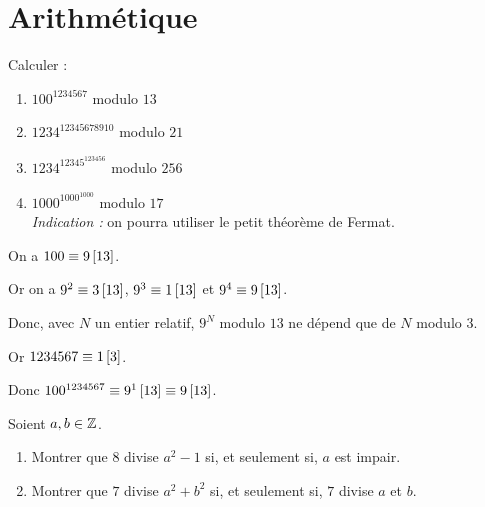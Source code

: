 \begin{corr}
\end{corr}

\section{Arithmétique}

\begin{exo}[Exercice 5]
Calculer :

\begin{enumerate}
\item \(100^{1234567}\) modulo \(13\) \\

\item \(1234^{12345678910}\) modulo \(21\) \\

\item \(1234^{12345^{123456}}\) modulo \(256\) \\

\item \(1000^{1000^{1000}}\) modulo \(17\) \\

\textit{Indication :} on pourra utiliser le petit théorème de Fermat.
\end{enumerate}
\end{exo}

\begin{corr}[1]
On a \(100\equiv9\left[13\right]\).

Or on a \(9^2\equiv3\left[13\right]\), \(9^3\equiv1\left[13\right]\) et \(9^4\equiv9\left[13\right]\).

Donc, avec \(N\) un entier relatif, \(9^N\) modulo \(13\) ne dépend que de \(N\) modulo \(3\).

Or \(1234567\equiv1\left[3\right]\).

Donc \(100^{1234567}\equiv9^1\left[13\right]\equiv9\left[13\right]\).
\end{corr}

\begin{exo}[Exercice 6]
Soient \(a,b\in\mathbb{Z}\).

\begin{enumerate}
\item Montrer que \(8\) divise \(a^2-1\) si, et seulement si, \(a\) est impair. \\

\item Montrer que \(7\) divise \(a^2+b^2\) si, et seulement si, \(7\) divise \(a\) et \(b\).
\end{enumerate}
\end{exo}

